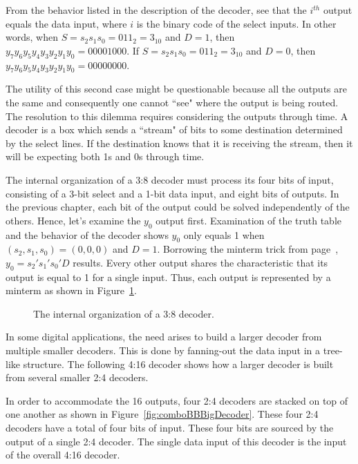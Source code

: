 From the behavior listed in the description of the decoder, 
see that the $i^{th}$ output equals the data input, where
$i$ is the binary code of the select inputs.  In other
words, when $S=s_2 s_1 s_0 = 011_2 = 3_{10}$ and $D=1$,
then $y_7 y_6 y_5 y_4 y_3 y_2 y_1 y_0 = 00001000$.  If 
$S= s_2 s_1 s_0 = 011_2 = 3_{10}$ and $D=0$, then
$y_7 y_6 y_5 y_4 y_3 y_2 y_1 y_0 = 00000000$.   

The utility of this second case might be questionable because
all the outputs are the same and consequently one cannot
``see" where the output is being routed.  The resolution
to this dilemma requires considering the outputs 
through time.  A decoder is a box which sends a ``stream" of 
bits to some destination determined by the select lines.
If the destination knows that it is receiving the stream, then it
will be expecting both 1s and 0s through time.

The internal organization of a 3:8 decoder must process its four bits
of input, consisting of a 3-bit select and a 1-bit data input, and
eight bits of outputs.  In 
the previous chapter, each bit of the output could
be solved independently of the others. Hence, let's examine the $y_0$
output first.  Examination of the truth table and the behavior of
the decoder shows $y_0$ only equals 1 when
$(s_2, s_1, s_0) = (0, 0, 0)$ and $D=1$.  Borrowing the minterm
trick from page~\pageref{page:MinTrick}, $y_0=s_2's_1's_0'D$ results.
Every other output shares the characteristic that its output is
equal to 1 for a single input. Thus, each output is represented
by a minterm as shown in Figure~\ref{fig:comboBB3:8Guts}.

\begin{figure}[ht]
\caption{The internal organization of a 3:8 decoder.}
\label{fig:comboBB3:8Guts}
\end{figure}

In some digital applications, the need arises to build a larger decoder
from multiple smaller decoders.  This is done by fanning-out the data input
in a tree-like structure.  The following 4:16 decoder shows how a larger decoder is
built from several smaller 2:4 decoders. 

In order to accommodate the 16 outputs, four 2:4 decoders are stacked
on top of one another as shown in Figure~\ref{fig:comboBBBigDecoder}.  These
four 2:4 decoders have a total of four bits of input.  These four bits
are sourced by the output of a single 2:4 decoder.  The
single data input of this decoder is the input of the overall 4:16
decoder.  

